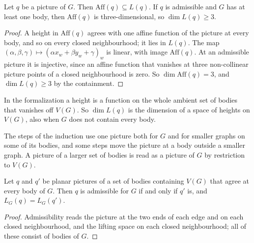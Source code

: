\begin{lemma}
  \label{lem:pencil-lifting-space-affine}
  \leanok
  Let $q$ be a picture of $G$. Then $\mathrm{Aff}(q) \subseteq L(q)$. If
  $q$ is admissible and $G$ has at least one body, then
  $\mathrm{Aff}(q)$ is three-dimensional, so $\dim L(q) \geq 3$.
\end{lemma}
\begin{proof}
  \leanok
  A height in $\mathrm{Aff}(q)$ agrees with one affine function of the
  picture at every body, and so on every closed neighbourhood; it lies in
  $L(q)$. The map $(\alpha, \beta, \gamma) \mapsto
  (\alpha x_w + \beta y_w + \gamma)_w$ is linear, with image
  $\mathrm{Aff}(q)$. At an admissible picture it is injective, since an
  affine function that vanishes at three non-collinear picture points of
  a closed neighbourhood is zero. So $\dim \mathrm{Aff}(q) = 3$, and
  $\dim L(q) \geq 3$ by the containment.
\end{proof}

\begin{fmlnote}
  \label{fmlnote:pencil-lifting-space}
  In the formalization a height is a function on the whole ambient set
  of bodies that vanishes off $V(G)$. So $\dim L(q)$ is the dimension of
  a space of heights on $V(G)$, also when $G$ does not contain every
  body.
\end{fmlnote}

The steps of the induction use one picture both for $G$ and for smaller
graphs on some of its bodies, and some steps move the picture at a body
outside a smaller graph. A picture of a larger set of bodies is read as a
picture of $G$ by restriction to $V(G)$.

\begin{lemma}
  \label{lem:pencil-picture-local}
  \leanok
  Let $q$ and $q'$ be planar pictures of a set of bodies containing
  $V(G)$ that agree at every body of $G$. Then $q$ is admissible for $G$
  if and only if $q'$ is, and $L_G(q) = L_G(q')$.
\end{lemma}
\begin{proof}
  \leanok
  Admissibility reads the picture at the two ends of each edge and on
  each closed neighbourhood, and the lifting space on each closed
  neighbourhood; all of these consist of bodies of $G$.
\end{proof}

